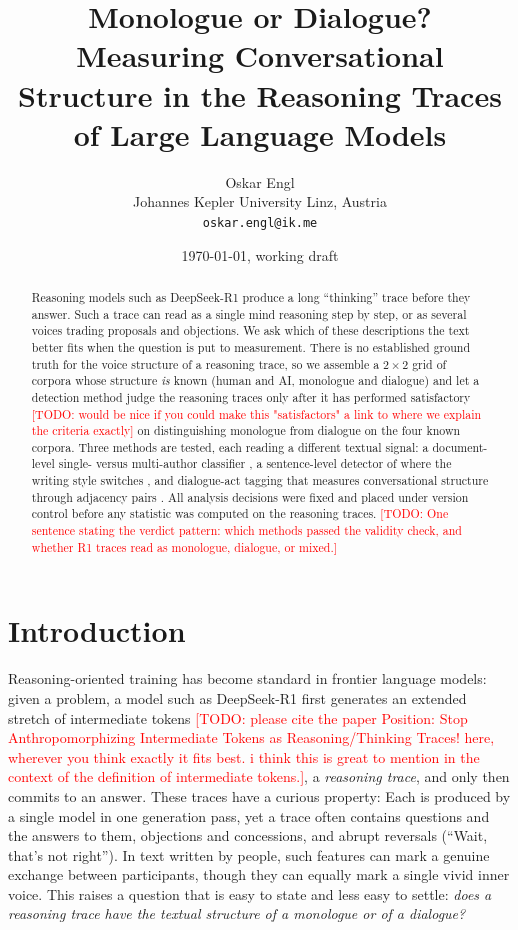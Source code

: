 \documentclass[11pt]{article}
\title{Monologue or Dialogue?\\
\large Measuring Conversational Structure in the Reasoning Traces\\ of Large Language Models}
\author{%
  Oskar Engl\\
  Johannes Kepler University Linz, Austria\\
  \texttt{oskar.engl@ik.me}%
}
\date{\today, working draft}
\newcommand{\todo}[1]{\textcolor{red}{[TODO: #1]}}
\begin{document}
\maketitle

\begin{abstract}
Reasoning models such as DeepSeek-R1 produce a long ``thinking'' trace before
they answer. Such a trace can read as a single mind reasoning step by step, or
as several voices trading proposals and objections. We ask which of these
descriptions the text better fits when the question is put to measurement.
There is no established ground truth for the voice structure of a reasoning
trace, so we assemble a $2{\times}2$ grid of corpora whose structure \emph{is}
known (human and AI, monologue and dialogue) and let a detection method judge
the reasoning traces only after it has performed satisfactory \todo{would be nice if 
you could make this "satisfactors" a link to where we explain the criteria 
exactly} on distinguishing monologue from dialogue on the four
known corpora. Three methods are tested, each reading a different textual
signal: a document-level single- versus multi-author classifier
\citep{nath2019style}, a sentence-level detector of where the writing style
switches \citep{schmidt2025sspc}, and dialogue-act tagging that measures
conversational structure through adjacency pairs \citep{duran2022cams,
schegloff1973opening}. All analysis decisions were fixed and placed under
version control before any statistic was computed on the reasoning traces.
\todo{One sentence stating the verdict pattern: which methods passed the
validity check, and whether R1 traces read as monologue, dialogue, or mixed.}
\end{abstract}

\section{Introduction}
\label{sec:intro}

Reasoning-oriented training has become standard in frontier language models:
given a problem, a model such as DeepSeek-R1 \citep{deepseek2025r1} first
generates an extended stretch of intermediate tokens \todo{please cite the 
paper Position: Stop Anthropomorphizing Intermediate Tokens as Reasoning/Thinking 
Traces! here, wherever you think exactly it fits best. i think this is great to 
mention in the context of the definition of intermediate tokens.}, a \emph{reasoning
trace}, and only then commits to an answer. These traces have a curious
property: Each is produced by a single model in one generation pass, yet a
trace often contains questions and the answers to them, objections and
concessions, and abrupt reversals (``Wait, that's not right''). In text
written by people, such features can mark a genuine exchange between
participants, though they can equally mark a single vivid inner voice. This
raises a question that is easy to state and less easy to settle: \emph{does a
reasoning trace have the textual structure of a monologue or of a dialogue?}
\end{document}
